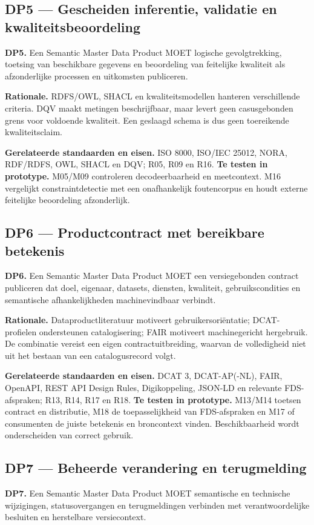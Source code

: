 \subsection*{DP5 --- Gescheiden inferentie, validatie en kwaliteitsbeoordeling}
\textbf{DP5.} Een Semantic Master Data Product MOET logische gevolgtrekking, toetsing van beschikbare gegevens en beoordeling van feitelijke kwaliteit als afzonderlijke processen en uitkomsten publiceren.

\textbf{Rationale.} RDFS/OWL, SHACL en kwaliteitsmodellen hanteren verschillende criteria. \citep{S29,S30,S32,S12,L15} DQV maakt metingen beschrijfbaar, maar levert geen casusgebonden grens voor voldoende kwaliteit. \citep{S34} Een geslaagd schema is dus geen toereikende kwaliteitsclaim.

\textbf{Gerelateerde standaarden en eisen.} ISO 8000, ISO/IEC 25012, NORA, RDF/RDFS, OWL, SHACL en DQV; R05, R09 en R16. \textbf{Te testen in prototype.} M05/M09 controleren decodeerbaarheid en meetcontext. M16 vergelijkt constraintdetectie met een onafhankelijk foutencorpus en houdt externe feitelijke beoordeling afzonderlijk.

\subsection*{DP6 --- Productcontract met bereikbare betekenis}
\textbf{DP6.} Een Semantic Master Data Product MOET een versiegebonden contract publiceren dat doel, eigenaar, datasets, diensten, kwaliteit, gebruikscondities en semantische afhankelijkheden machinevindbaar verbindt.

\textbf{Rationale.} Dataproductliteratuur motiveert gebruikersoriëntatie; DCAT-profielen ondersteunen catalogisering; FAIR motiveert machinegericht hergebruik. \citep{L12,S47,S45,S16,L11} De combinatie vereist een eigen contractuitbreiding, waarvan de volledigheid niet uit het bestaan van een catalogusrecord volgt.

\textbf{Gerelateerde standaarden en eisen.} DCAT 3, DCAT-AP(-NL), FAIR, OpenAPI, REST API Design Rules, Digikoppeling, JSON-LD en relevante FDS-afspraken; R13, R14, R17 en R18. \textbf{Te testen in prototype.} M13/M14 toetsen contract en distributie, M18 de toepasselijkheid van FDS-afspraken en M17 of consumenten de juiste betekenis en broncontext vinden. Beschikbaarheid wordt onderscheiden van correct gebruik.

\subsection*{DP7 --- Beheerde verandering en terugmelding}
\textbf{DP7.} Een Semantic Master Data Product MOET semantische en technische wijzigingen, statusovergangen en terugmeldingen verbinden met verantwoordelijke besluiten en herstelbare versiecontext.

